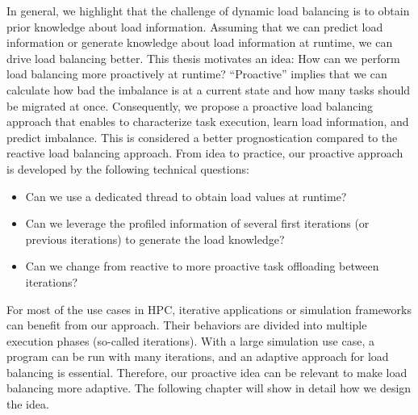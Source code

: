 In general, we highlight that the challenge of dynamic load balancing is to obtain prior knowledge about load information. Assuming that we can predict load information or generate knowledge about load information at runtime, we can drive load balancing better. This thesis motivates an idea: How can we perform load balancing more proactively at runtime? ``Proactive'' implies that we can calculate how bad the imbalance is at a current state and how many tasks should be migrated at once. Consequently, we propose a proactive load balancing approach that enables to characterize task execution, learn load information, and predict imbalance. This is considered a better prognostication compared to the reactive load balancing approach. From idea to practice, our proactive approach is developed by the following technical questions:
\begin{itemize}
	\item Can we use a dedicated thread to obtain load values at runtime?
	\item Can we leverage the profiled information of several first iterations (or previous iterations) to generate the load knowledge?
	\item Can we change from reactive to more proactive task offloading between iterations?
\end{itemize}

For most of the use cases in HPC, iterative applications or simulation frameworks can benefit from our approach. Their behaviors are divided into multiple execution phases (so-called iterations). With a large simulation use case, a program can be run with many iterations, and an adaptive approach for load balancing is essential. Therefore, our proactive idea can be relevant to make load balancing more adaptive. The following chapter will show in detail how we design the idea.

